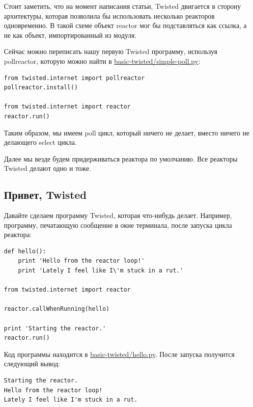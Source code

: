 Стоит заметить, что на момент написания статьи, Twisted двигается в 
сторону архитектуры, которая позволила бы использовать 
несколько реакторов одновременно. В такой схеме объект 
reactor мог бы подставляться как ссылка, а не как объект,  
импортированный из модуля.


Сейчас можно переписать нашу первую Twisted программу, 
используя pollreactor, которую можно найти в 
\href{http://github.com/jdavisp3/twisted-intro/blob/master/basic-twisted/simple-poll.py}{basic-twisted/simple-poll.py}:

\begin{scriptsize}\begin{verbatim}
from twisted.internet import pollreactor
pollreactor.install()

from twisted.internet import reactor
reactor.run()
\end{verbatim}\end{scriptsize}

Таким образом, мы имеем poll цикл, который ничего не делает, вместо 
ничего не делающего select цикла. 


Далее мы везде будем придерживаться реактора по умолчанию. Все 
реакторы Twisted делают одно и тоже.


\subsection{Привет, Twisted}

Давайте сделаем программу Twisted, которая что-нибудь делает. 
Например, программу, печатающую сообщение в окне терминала, 
после запуска цикла реактора:

\begin{scriptsize}\begin{verbatim}
def hello():
    print 'Hello from the reactor loop!'
    print 'Lately I feel like I\'m stuck in a rut.'

from twisted.internet import reactor

reactor.callWhenRunning(hello)

print 'Starting the reactor.'
reactor.run()
\end{verbatim}\end{scriptsize}

Код программы находится в 
\href{http://github.com/jdavisp3/twisted-intro/blob/master/basic-twisted/hello.py}{basic-twisted/hello.py}. 
После запуска получится следующий вывод:

\begin{scriptsize}\begin{verbatim}
Starting the reactor.
Hello from the reactor loop!
Lately I feel like I'm stuck in a rut.
\end{verbatim}\end{scriptsize}


